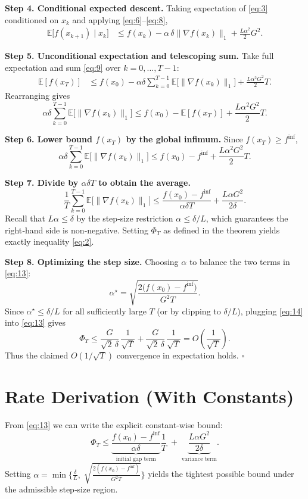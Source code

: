 \documentclass{article}
\newcommand{\E}{\mathbb{E}}
\begin{document}
\noindent\textbf{Step 4. Conditional expected descent.}  
Taking expectation of \eqref{eq:3} conditioned on $x_k$ and applying \eqref{eq:6}–\eqref{eq:8},
\begin{align}
\E\bigl[f(x_{k+1})\mid x_k\bigr]
&\le f(x_k)-\alpha\,\delta\|\nabla f(x_k)\|_1
   +\frac{L\alpha^2}{2}G^2 . \tag{9}
\end{align}

\noindent\textbf{Step 5. Unconditional expectation and telescoping sum.}  
Take full expectation and sum \eqref{eq:9} over $k=0,\dots,T-1$:
\begin{align}
\E[f(x_T)] &\le f(x_0)-\alpha\delta\sum_{k=0}^{T-1}\E\bigl[\|\nabla f(x_k)\|_1\bigr]
            +\frac{L\alpha^2 G^2}{2}T . \tag{10}
\end{align}
Rearranging gives
\[
\alpha\delta\sum_{k=0}^{T-1}\E\bigl[\|\nabla f(x_k)\|_1\bigr]
\le f(x_0)-\E[f(x_T)]+\frac{L\alpha^2 G^2}{2}T .
\tag{11}
\]

\noindent\textbf{Step 6. Lower bound $f(x_T)$ by the global infimum.}  
Since $f(x_T)\ge f^{\inf}$,
\[
\alpha\delta\sum_{k=0}^{T-1}\E\bigl[\|\nabla f(x_k)\|_1\bigr]
\le f(x_0)-f^{\inf}+\frac{L\alpha^2 G^2}{2}T . \tag{12}
\]

\noindent\textbf{Step 7. Divide by $\alpha\delta T$ to obtain the average.}
\[
\frac{1}{T}\sum_{k=0}^{T-1}\E\bigl[\|\nabla f(x_k)\|_1\bigr]
\le \frac{f(x_0)-f^{\inf}}{\alpha\delta T}
   +\frac{L\alpha G^2}{2\delta}. \tag{13}
\]
Recall that $L\alpha\le \delta$ by the step‑size restriction $\alpha\le\delta/L$, which guarantees the right‑hand side is non‑negative. Setting $\Phi_T$ as defined in the theorem yields exactly inequality \eqref{eq:2}.

\noindent\textbf{Step 8. Optimizing the step size.}  
Choosing $\alpha$ to balance the two terms in \eqref{eq:13}:
\[
\alpha^\star = \sqrt{\frac{2\bigl(f(x_0)-f^{\inf}\bigr)}{G^2 T}} .
\tag{14}
\]
Since $\alpha^\star\le\delta/L$ for all sufficiently large $T$ (or by clipping to $\delta/L$), plugging \eqref{eq:14} into \eqref{eq:13} gives
\[
\Phi_T \le \frac{G}{\sqrt{2}\,\delta}\,\frac{1}{\sqrt{T}}+ \frac{G}{\sqrt{2}\,\delta}\,\frac{1}{\sqrt{T}}
= O\!\left(\frac{1}{\sqrt{T}}\right).
\tag{15}
\]
Thus the claimed $O(1/\sqrt{T})$ convergence in expectation holds. $\square$

\section*{Rate Derivation (With Constants)}
From \eqref{eq:13} we can write the explicit constant‑wise bound:
\[
\Phi_T \le
\underbrace{\frac{f(x_0)-f^{\inf}}{\alpha\delta}}_{\text{initial gap term}}
\frac{1}{T}
\;+\;
\underbrace{\frac{L\alpha G^2}{2\delta}}_{\text{variance term}} .
\]
Setting $\alpha = \min\bigl\{\frac{\delta}{L},\;\sqrt{\frac{2(f(x_0)-f^{\inf})}{G^2 T}}\bigr\}$ yields the tightest possible bound under the admissible step‑size region.
\end{document}
